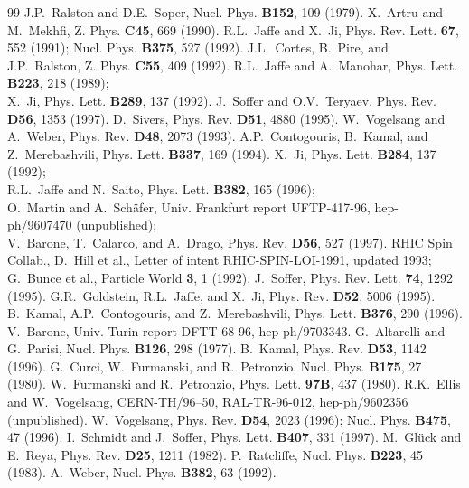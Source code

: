 \begin{thebibliography}{99}
 J.P.\ Ralston and D.E.\ Soper, Nucl. Phys. {\bf B152}, 109
(1979).
 X.\ Artru and M.\ Mekhfi, Z. Phys. {\bf C45}, 669 (1990).
 R.L.\ Jaffe and  X.\ Ji, Phys. Rev. Lett. {\bf 67}, 
552 (1991); Nucl. Phys. {\bf B375}, 527 (1992).
 J.L.\ Cortes, B.\ Pire, and J.P.\ Ralston,
Z. Phys. {\bf C55}, 409 (1992).
 R.L.\ Jaffe and A.\ Manohar, Phys. Lett. {\bf B223}, 
218 (1989); \\ X.\ Ji, Phys. Lett. {\bf B289}, 137 (1992).
 J.\ Soffer and O.V.\ Teryaev, Phys. Rev. {\bf D56},
1353 (1997).
 D.\ Sivers, Phys. Rev. {\bf D51}, 4880 (1995).
 W.\ Vogelsang and A.\ Weber, Phys. Rev. {\bf D48}, 2073
(1993).
 A.P.\ Contogouris, B.\ Kamal, and Z.\ Merebashvili,
Phys. Lett. {\bf B337}, 169 (1994).
 X.\ Ji, Phys. Lett. {\bf B284}, 137 (1992); \\
R.L.\ Jaffe and N.\ Saito, Phys. Lett. {\bf B382}, 165 (1996); \\ 
O.\ Martin and A.\ Sch\"{a}fer, Univ. Frankfurt report UFTP-417-96,
hep-ph/9607470 (unpublished); \\
V.\ Barone, T.\ Calarco, and A.\ Drago, Phys. Rev. {\bf D56}, 527 (1997).
 RHIC Spin Collab., D.\ Hill et al., Letter of intent 
RHIC-SPIN-LOI-1991, updated 1993; 
G.\ Bunce et al., Particle World {\bf 3}, 1 (1992).
 J.\ Soffer, Phys. Rev. Lett. {\bf 74}, 1292 (1995).
 G.R.\ Goldstein, R.L.\ Jaffe, and X.\ Ji, Phys. Rev. 
{\bf D52}, 5006 (1995).
 B.\ Kamal, A.P.\ Contogouris, and Z.\ Merebashvili,
Phys. Lett. {\bf B376}, 290 (1996).
 V.\ Barone, Univ. Turin report DFTT-68-96, 
hep-ph/9703343. 
 G.\ Altarelli and G.\ Parisi, Nucl. Phys. {\bf B126},
298 (1977).
 B.\ Kamal, Phys. Rev. {\bf D53}, 1142 (1996).
 G.\ Curci, W.\ Furmanski, and R.\ Petronzio, Nucl. Phys.
{\bf B175}, 27 (1980).
 W.\ Furmanski and R.\ Petronzio, Phys. Lett.
{\bf 97B}, 437 (1980).
 R.K.\ Ellis and W.\ Vogelsang, CERN-TH/96--50, RAL-TR-96-012, 
hep-ph/9602356 (unpublished).
 W.\ Vogelsang, Phys. Rev. {\bf D54}, 2023 (1996);
Nucl. Phys. {\bf B475}, 47 (1996).
 I.\ Schmidt and J.\ Soffer, Phys. Lett. {\bf B407},
331 (1997).  
 M.\ Gl\"{u}ck and E.\ Reya, Phys. Rev. {\bf D25}, 1211 (1982).
 P.\ Ratcliffe, Nucl. Phys. {\bf B223}, 45 (1983).
 A.\ Weber, Nucl. Phys. {\bf B382}, 63 (1992).

\end{thebibliography}
